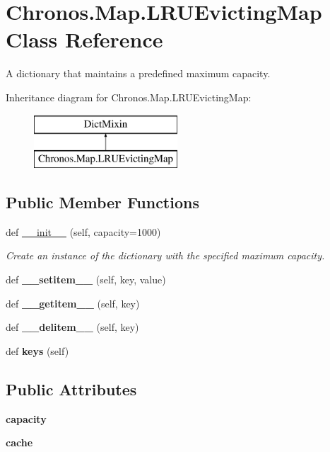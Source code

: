\hypertarget{classChronos_1_1Map_1_1LRUEvictingMap}{}\section{Chronos.\+Map.\+L\+R\+U\+Evicting\+Map Class Reference}
\label{classChronos_1_1Map_1_1LRUEvictingMap}


A dictionary that maintains a predefined maximum capacity.  


Inheritance diagram for Chronos.\+Map.\+L\+R\+U\+Evicting\+Map\+:\begin{figure}[H]
\begin{center}
\leavevmode
\includegraphics[height=2.000000cm]{classChronos_1_1Map_1_1LRUEvictingMap}
\end{center}
\end{figure}
\subsection*{Public Member Functions}
\begin{DoxyCompactItemize}
\item 
def \hyperlink{group__PyInfrastructure_ga792e630c1a4c608f22ccbc4f784b710e}{\+\_\+\+\_\+init\+\_\+\+\_\+} (self, capacity=1000)
\begin{DoxyCompactList}\small\item\em Create an instance of the dictionary with the specified maximum capacity. \end{DoxyCompactList}\item 
def {\bfseries \+\_\+\+\_\+setitem\+\_\+\+\_\+} (self, key, value)
\item 
def {\bfseries \+\_\+\+\_\+getitem\+\_\+\+\_\+} (self, key)
\item 
def {\bfseries \+\_\+\+\_\+delitem\+\_\+\+\_\+} (self, key)
\item 
def {\bfseries keys} (self)
\end{DoxyCompactItemize}
\subsection*{Public Attributes}
\begin{DoxyCompactItemize}
\item 
{\bfseries capacity}
\item 
{\bfseries cache}
\end{DoxyCompactItemize}


